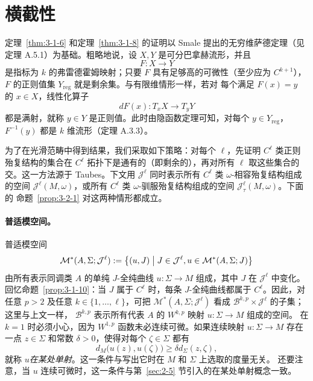 
\section{横截性}\label{sec:3-2}

定理~\ref{thm:3-1-6} 和定理~\ref{thm:3-1-8} 的证明以 Smale
 提出的无穷维萨德定理（见定理 A.5.1）为基础。粗略地说，设 $X,Y$
是可分巴拿赫流形，并且
\[
  F:X\longrightarrow Y
\]
是指标为 $k$ 的弗雷德霍姆映射；只要 $F$ 具有足够高的可微性（至少应为
$C^{k+1}$），$F$ 的正则值集 $Y_{\mathrm{reg}}$ 就是剩余集。与有限维情形一样，若对
每个满足 $F(x)=y$ 的 $x\in X$，线性化算子
\[
  dF(x):T_xX\longrightarrow T_yY
\]
都是满射，就称 $y\in Y$ 是正则值。此时由隐函数定理可知，对每个
$y\in Y_{\mathrm{reg}}$，$F^{-1}(y)$ 都是 $k$ 维流形（定理 A.3.3）。

为了在光滑范畴中得到结果，我们采取如下策略：对每个 $\ell$，先证明 $C^\ell$ 类正则
殆复结构的集合在 $C^\ell$ 拓扑下是通有的（即剩余的），再对所有 $\ell$ 取这些集合的
交。这一方法源于 Taubes。下文用 $\mathcal J^\ell$ 同时表示所有 $C^\ell$ 类
$\omega$-相容殆复结构组成的空间 $\mathcal J^\ell(M,\omega)$，或所有 $C^\ell$ 类
$\omega$-驯服殆复结构组成的空间 $\mathcal J_\tau^\ell(M,\omega)$。下面的
命题~\ref{prop:3-2-1} 对这两种情形都成立。

\paragraph{普适模空间。}
普适模空间
\[
  \mathcal M^*(A,\Sigma;\mathcal J^\ell)
  :=\bigl\{(u,J)\bigm|J\in\mathcal J^\ell,
  u\in\mathcal M^*(A,\Sigma;J)\bigr\}
\]
由所有表示同调类 $A$ 的单纯 $J$-全纯曲线 $u:\Sigma\to M$ 组成，其中 $J$ 在
$\mathcal J^\ell$ 中变化。回忆命题~\ref{prop:3-1-10}：当 $J$ 属于 $C^\ell$ 时，每条
$J$-全纯曲线都属于 $C^\ell$。因此，对任意 $p>2$ 及任意
$k\in\{1,\ldots,\ell\}$，可把 $\mathcal M^*(A,\Sigma;\mathcal J^\ell)$ 看成
$\mathcal B^{k,p}\times\mathcal J^\ell$ 的子集；这里与上文一样，
$\mathcal B^{k,p}$ 表示所有代表 $A$ 的 $W^{k,p}$ 映射 $u:\Sigma\to M$ 组成的空间。
在 $k=1$ 时必须小心，因为 $W^{1,p}$ 函数未必连续可微。如果连续映射
$u:\Sigma\to M$ 存在一点 $z\in\Sigma$ 和常数 $\delta>0$，使得对每个
$\zeta\in\Sigma$ 都有
\[
  d_M\bigl(u(z),u(\zeta)\bigr)
  \ge \delta d_\Sigma(z,\zeta),
\]
就称 $u$\emph{在某处单射}。这一条件与写出它时在 $M$ 和 $\Sigma$ 上选取的度量无关。
还要注意，当 $u$ 连续可微时，这一条件与第~\ref{sec:2-5} 节引入的在某处单射概念一致。

